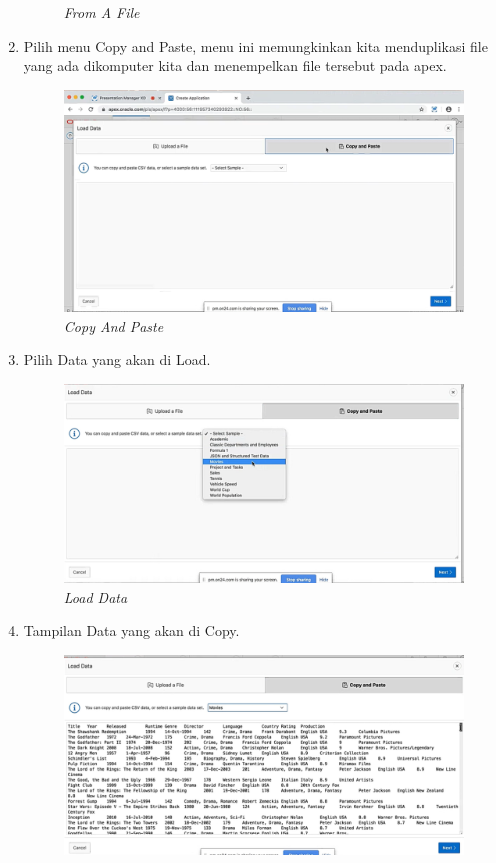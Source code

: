 \begin{enumerate}
\begin{figure}[H]
    \caption{\textit{From A File}}
    \label{File}
\end{figure}
 \item Pilih menu Copy and Paste, menu ini memungkinkan kita menduplikasi file yang ada dikomputer kita dan menempelkan file tersebut pada apex.
 \begin{figure}[H]
    \centering
    \includegraphics[scale=0.5]{figures/7}
    \caption{\textit{Copy And Paste}}
    \label{CopyPaste}
\end{figure}
 \item Pilih Data yang akan di Load.
 \begin{figure}[H]
    \centering
    \includegraphics[scale=0.5]{figures/8}
    \caption{\textit{Load Data}}
    \label{LoadData}
\end{figure}
 \item Tampilan Data yang akan di Copy.
 \begin{figure}[H]
    \centering
    \includegraphics[scale=0.5]{figures/9}

\end{figure}
\end{enumerate}

